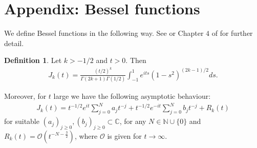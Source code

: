 \documentclass[a4paper, reqno, 11pt]{amsart}
\theoremstyle{definition}
\newtheorem{definition}{Definition}[section]
\begin{document}
	\appendix
	
		\section{Appendix: Bessel functions}\label{app:bessel}
We define Bessel functions in the following way. See \cite{watson} or Chapter $4$ of \cite{steinweiss} for further detail. %
	\begin{definition}\label{lemma:bessel_kreal}
		Let $k > -1/2$ and $t > 0$. Then
		\begin{align}\label{eq:bessel2}
			J_k(t) = \frac{(t/2)^k}{\Gamma(2k+1)\Gamma(1/2)} \int_{-1}^1 e^{its} (1-s^2)^{(2k-1)/2}ds.
		\end{align}
	\end{definition}
	
Moreover, for $t$ large we have the following asymptotic behaviour:
		\begin{align}\label{eq:asympBessel}
			J_k(t) = t^{-1/2} e^{it} \sum_{j=0}^N a_j t^{-j} + t^{-1/2} e^{-it} \sum_{j=0}^N b_j t^{-j} + R_k(t)
		\end{align}
for suitable $(a_j)_{j \geq 0}, (b_j)_{j \geq 0} \subset \mathbb{C}$,	for any $N \in \mathbb{N} \cup \{0\}$ and $R_k(t) = \mathcal{O}(t^{-N-\frac{3}{2}})$, where $\mathcal{O}$ is given for $t \rightarrow \infty$. 
\\
\end{document}
